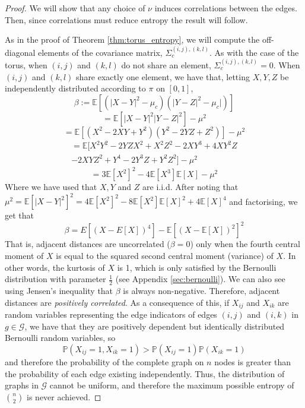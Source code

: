 \documentclass{article}
\newcommand{\graph}{\mathcal{G}}
\newcommand{\prob}[1]{\mathbb{P}\left(#1\right)}
\begin{document}
\begin{proof}
    We will show that any choice of $\nu$ induces correlations between the edges. Then, since correlations must reduce entropy the result will follow. \newline

    As in the proof of Theorem \ref{thm:torus_entropy}, we will compute the off-diagonal elements of the covariance matrix, $\Sigma_c^{(i,j),(k,l)}$. As with the case of the torus, when $(i,j)$ and $(k,l)$ do not share an element, $\Sigma_c^{(i,j),(k,l)}=0$. When $(i,j)$ and $(k,l)$ share exactly one element, we have that, letting $X,Y,Z$ be independently distributed according to $\pi$ on $[0,1]$,
    \begin{equation}
        \beta := \mathbb{E}[(|X-Y|^2-\mu_c)(|Y-Z|^2-\mu_c|)]
    \end{equation}
    \begin{equation}
        = \mathbb{E}[|X-Y|^2|Y-Z|^2] - \mu^2
    \end{equation}
    \begin{equation}
        = \mathbb{E}[(X^2-2XY+Y^2)(Y^2-2YZ+Z^2)]-\mu^2
    \end{equation}
    \begin{gather}
        = \mathbb{E}[X^2Y^2 - 2YZX^2 + X^2Z^2 - 2XY^3 + 4XY^2Z \nonumber \\
        - 2XYZ^2 + Y^4 - 2Y^3Z+Y^2Z^2] - \mu^2
    \end{gather}
    \begin{equation}
        = 3\mathbb{E}[X^2]^2 - 4\mathbb{E}[X^3]\mathbb{E}[X] - \mu^2
    \end{equation}
    Where we have used that $X,Y$ and $Z$ are i.i.d. After noting that $\mu^2 = \mathbb{E}[|X-Y|^2]^2 = 4\mathbb{E}[X^2]^2-8\mathbb{E}[X^2]\mathbb{E}[X]^2+4\mathbb{E}[X]^4$ and factorising, we get that
    \begin{equation}
        \beta = E[(X-E[X])^4] - \mathbb{E}[(X-\mathbb{E}[X])^2]^2
    \end{equation}
    That is, adjacent distances are uncorrelated ($\beta=0$) only when the fourth central moment of $X$ is equal to the squared second central moment (variance) of $X$. In other words, the kurtosis of $X$ is 1, which is only satisfied by the Bernoulli distribution with parameter $\frac{1}{2}$ (see Appendix \ref{sec:bernoulli}). We can also see using Jensen's inequality that $\beta$ is always non-negative. Therefore, adjacent distances are \textit{positively correlated}. As a consequence of this, if $X_{ij}$ and $X_{ik}$ are random variables representing the edge indicators of edges $(i,j)$ and $(i,k)$ in $g\in\graph$, we have that they are positively dependent but identically distributed Bernoulli random variables, so
    \begin{equation}
        \prob{X_{ij}=1, X_{ik}=1} > \prob{X_{ij}=1}\prob{X_{ik}=1}
    \end{equation}
    and therefore the probability of the complete graph on $n$ nodes is greater than the probability of each edge existing independently. Thus, the distribution of graphs in $\graph$ cannot be uniform, and therefore the maximum possible entropy of $\binom{n}{2}$ is never achieved.
\end{proof}
\end{document}
